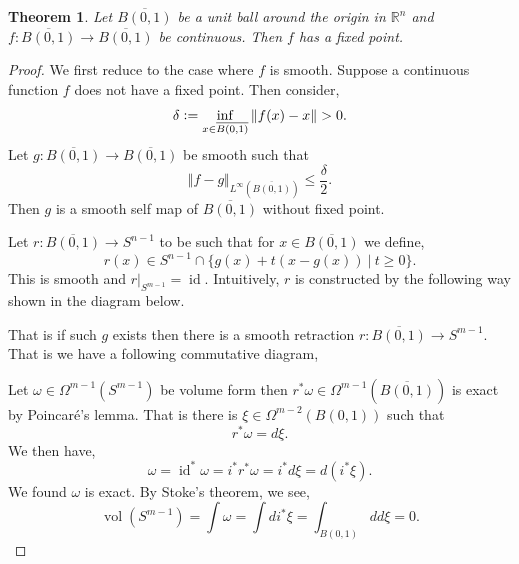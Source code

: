\documentclass[10pt]{article}
\newtheorem{theorem}{Theorem} [section]
\DeclareMathOperator{\id}{id}
\DeclareMathOperator{\vol}{vol}
\newcommand{\defeq}{\vcentcolon=}
\newcommand{\norm}[1]{\Vert #1 \Vert}
\newcommand{\R}[0]{\mathbb{R}}
\newcommand{\sep}[0]{\:|\:}
\begin{document}
\begin{theorem}
  Let $\overline{B(0,1)}$ be a unit ball around the origin in $\R^n$ and $f:\overline{B(0,1)}\to \overline{B(0,1)}$ be continuous. Then $f$ has a fixed point.
\end{theorem}
\begin{proof}
  We first reduce to the case where $f$ is smooth. Suppose a continuous function $f$ does not have a fixed point. Then consider,
  \begin{equation*}
    \delta \defeq \inf_{x\in\overline{B(0,1)}}\norm{f(x)-x}>0.
  \end{equation*}
  Let $g:\overline{B(0,1)}\to \overline{B(0,1)}$ be smooth such that 
  \begin{equation*}
    \norm{f-g}_{L^\infty(\overline{B(0,1)})} \leq {\frac {\delta} 2}.
  \end{equation*}
  Then $g$ is a smooth self map of $\overline{B(0,1)}$ without fixed point.
  \par Let $r:\overline{B(0,1)}\to S^{n-1}$ to be such that for $x\in\overline{B(0,1)}$ we define,
  \begin{equation*}
    r(x) \in S^{n-1}\cap\{g(x)+t(x-g(x))\sep t\geq0\}.
  \end{equation*}
  This is smooth and $r|_{S^{m-1}}=\id$. Intuitively, $r$ is constructed by the following way shown in the diagram below.
  \begin{center}
  \end{center}
  That is if such $g$ exists then there is a smooth retraction $r:\overline{B(0,1)}\to S^{m-1}$. That is we have a following commutative diagram,
  \begin{center}
  \end{center}
Let $\omega\in\Omega^{m-1}(S^{m-1})$ be volume form then $r^*\omega\in\Omega^{m-1}(\overline{B(0,1)})$ is exact by Poincaré's lemma. That is there is $\xi\in \Omega^{m-2}(B(0,1))$ such that 
\begin{equation*}
  r^*\omega = d\xi.
\end{equation*}
We then have,
\begin{equation*}
  \omega = \id^*\omega = i^*r^*\omega = i^*d\xi = d(i^*\xi).
\end{equation*}
We found $\omega$ is exact. By Stoke's theorem, we see,
\begin{equation*}
  \vol(S^{m-1}) = \int\omega = \int di^*\xi = \int_{B(0,1)}dd\xi = 0.
\end{equation*}
\end{proof}
\end{document}
